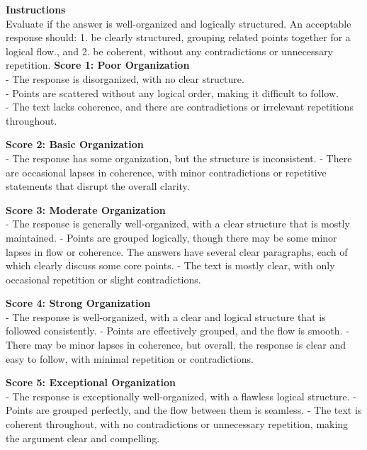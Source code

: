 \begin{table}[h!]
\begin{tcolorbox}[colback=blue!5!white,colframe=blue!75!black]
{\bf Instructions}\\ 
Evaluate if the answer is well-organized and logically structured. An acceptable response should: 1. be clearly structured, grouping related points together for a logical flow., and 2. be coherent, without any contradictions or unnecessary repetition.
\tcblower
{\bf Score 1: Poor Organization}\\
- The response is disorganized, with no clear structure. \\
- Points are scattered without any logical order, making it difficult to follow. \\
- The text lacks coherence, and there are contradictions or irrelevant repetitions throughout. 

{\bf Score 2: Basic Organization}\\
- The response has some organization, but the structure is inconsistent. 
- There are occasional lapses in coherence, with minor contradictions or repetitive statements that disrupt the overall clarity.

{\bf Score 3: Moderate Organization}\\
- The response is generally well-organized, with a clear structure that is mostly maintained. 
- Points are grouped logically, though there may be some minor lapses in flow or coherence. The answers have several clear paragraphs, each of which clearly discuss some core points. 
- The text is mostly clear, with only occasional repetition or slight contradictions.

{\bf Score 4: Strong Organization}\\
- The response is well-organized, with a clear and logical structure that is followed consistently. 
- Points are effectively grouped, and the flow is smooth. 
- There may be minor lapses in coherence, but overall, the response is clear and easy to follow, with minimal repetition or contradictions.

{\bf Score 5: Exceptional Organization}\\
- The response is exceptionally well-organized, with a flawless logical structure. 
- Points are grouped perfectly, and the flow between them is seamless. 
- The text is coherent throughout, with no contradictions or unnecessary repetition, making the argument clear and compelling.
\end{tcolorbox}
\caption{\label{tab:rubrics_organizations} {\bf Evaluation rubrics for organization.} The evaluation instructions and five-point rubric for assessing organization.  }
\end{table}


